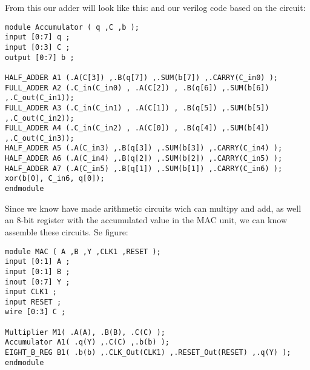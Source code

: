 From this our adder will look like this:
and our verilog code based on the circuit:
\begin{lstlisting}
module Accumulator ( q ,C ,b );
input [0:7] q ;
input [0:3] C ;
output [0:7] b ;

HALF_ADDER A1 (.A(C[3]) ,.B(q[7]) ,.SUM(b[7]) ,.CARRY(C_in0) );
FULL_ADDER A2 (.C_in(C_in0) , .A(C[2]) , .B(q[6]) ,.SUM(b[6]) ,.C_out(C_in1));	
FULL_ADDER A3 (.C_in(C_in1) , .A(C[1]) , .B(q[5]) ,.SUM(b[5]) ,.C_out(C_in2));	 
FULL_ADDER A4 (.C_in(C_in2) , .A(C[0]) , .B(q[4]) ,.SUM(b[4]) ,.C_out(C_in3));
HALF_ADDER A5 (.A(C_in3) ,.B(q[3]) ,.SUM(b[3]) ,.CARRY(C_in4) );  
HALF_ADDER A6 (.A(C_in4) ,.B(q[2]) ,.SUM(b[2]) ,.CARRY(C_in5) );
HALF_ADDER A7 (.A(C_in5) ,.B(q[1]) ,.SUM(b[1]) ,.CARRY(C_in6) );
xor(b[0], C_in6, q[0]);
endmodule
\end{lstlisting}

Since we know have made arithmetic circuits wich can multipy and add, as well an 8-bit register with the accumulated value in the MAC unit, we can know assemble these circuits. Se figure: 

 


\begin{lstlisting}
module MAC ( A ,B ,Y ,CLK1 ,RESET );
input [0:1] A ;
input [0:1] B ;
inout [0:7] Y ;
input CLK1 ;
input RESET ;
wire [0:3] C ;

Multiplier M1( .A(A), .B(B), .C(C) ); 
Accumulator A1( .q(Y) ,.C(C) ,.b(b) ); 
EIGHT_B_REG B1( .b(b) ,.CLK_Out(CLK1) ,.RESET_Out(RESET) ,.q(Y) );
endmodule
\end{lstlisting}

